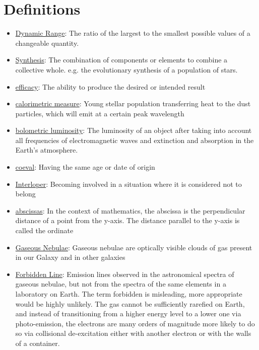\documentclass{literature}
\begin{document}
\progress
\label{progress}

\summary
\label{summary}


\section{Definitions}
\begin{itemize}
\item \underline{Dynamic Range}: The ratio of the largest to the smallest possible values of a changeable quantity.
\item \underline{Synthesis}: The combination of components or elements to combine a collective whole. e.g. the evolutionary synthesis of a population of stars.
\item \underline{efficacy}: The ability to produce the desired or intended result
\item \underline{calorimetric measure}: Young stellar population transferring heat to the dust particles, which will emit at a certain peak wavelength
\item \underline{bolometric luminosity}: The luminosity of an object after taking into account all frequencies of electromagnetic waves and extinction and absorption in the Earth's atmosphere.
\item \underline{coeval}: Having the same age or date of origin
\item \underline{Interloper}: Becoming involved in a situation where it is considered not to belong	
\item \underline{abscissas}: In the context of mathematics, the abscissa is the perpendicular distance of a point from the y-axis. The distance parallel to the y-axis is called the ordinate
\item \underline{Gaseous Nebulae}: Gaseous nebulae are optically visible clouds of gas present in our Galaxy and in other galaxies
\item \underline{Forbidden Line}: Emission lines observed in the astronomical spectra of gaseous nebulae, but not from the spectra of the same elements in a laboratory on Earth. The term forbidden is misleading, more appropriate would be highly unlikely. The gas cannot be sufficiently rarefied on Earth, and instead of transitioning from a higher energy level to a lower one via photo-emission, the electrons are many orders of magnitude more likely to do so via collisional de-excitation either with another electron or with the walls of a container.

\end{itemize}
\end{document}
